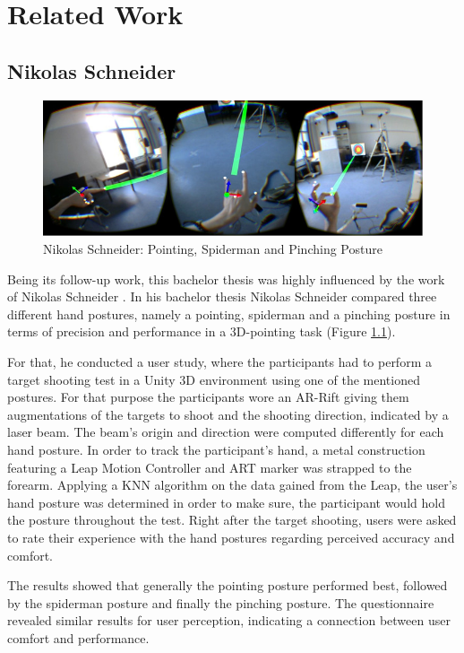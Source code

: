 \chapter{Related Work}\label{chapter:related}

\section{Nikolas Schneider}

\begin{figure}[h]
\centering
\includegraphics[width=\textwidth]{nick}
\caption{Nikolas Schneider: Pointing, Spiderman and Pinching Posture}
\label{fig:Nick}
\end{figure}

Being its follow-up work, this bachelor thesis was highly influenced by the work of Nikolas Schneider \cite{schneider_2016}. In his bachelor thesis Nikolas Schneider compared three different hand postures, namely a pointing, spiderman and a pinching posture in terms of precision and performance in a 3D-pointing task (Figure \ref{fig:Nick}). 

For that, he conducted a user study, where the participants had to perform a target shooting test in a Unity 3D environment using one of the mentioned postures. For that purpose the participants wore an AR-Rift giving them augmentations of the targets to shoot and the shooting direction, indicated by a laser beam. The beam's origin and direction were computed differently for each hand posture.  In order to track the participant's hand, a metal construction featuring a Leap Motion Controller and ART marker was strapped to the forearm. Applying a KNN algorithm on the data gained from the Leap, the user's hand posture was determined in order to make sure, the participant would hold the posture throughout the test. Right after the target shooting, users were asked to rate their experience with the hand postures regarding perceived accuracy and comfort. 

The results showed that generally the pointing posture performed best, followed by the spiderman posture and finally the pinching posture. The questionnaire revealed similar results for user perception, indicating a connection between user comfort and performance.

